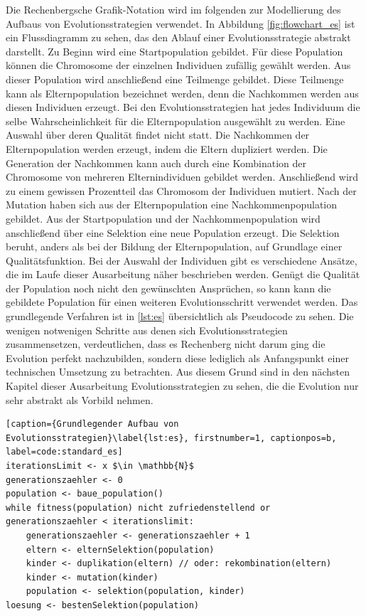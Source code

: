 Die Rechenbergsche Grafik-Notation wird im folgenden zur Modellierung des Aufbaus von Evolutionsstrategien verwendet. In Abbildung \ref{fig:flowchart_es} ist ein Flussdiagramm zu sehen, das den Ablauf einer Evolutionsstrategie abstrakt darstellt.
Zu Beginn wird eine Startpopulation gebildet. Für diese Population können die Chromosome der einzelnen Individuen zufällig gewählt werden. Aus dieser Population wird anschließend eine Teilmenge gebildet. Diese Teilmenge kann als Elternpopulation bezeichnet werden, denn die Nachkommen werden aus diesen Individuen erzeugt. Bei den Evolutionsstrategien hat jedes Individuum die selbe Wahrscheinlichkeit für die Elternpopulation ausgewählt zu werden. Eine Auswahl über deren Qualität findet nicht statt. Die Nachkommen der Elternpopulation werden erzeugt, indem die Eltern dupliziert werden. Die Generation der Nachkommen kann auch durch eine Kombination der Chromosome von mehreren Elternindividuen gebildet werden. Anschließend wird zu einem gewissen Prozentteil das Chromosom der Individuen mutiert. 
Nach der Mutation haben sich aus der Elternpopulation eine Nachkommenpopulation gebildet. Aus der Startpopulation und der Nachkommenpopulation wird anschließend über eine Selektion eine neue Population erzeugt. Die Selektion beruht, anders als bei der Bildung der Elternpopulation, auf Grundlage einer Qualitätsfunktion.
Bei der Auswahl der Individuen gibt es verschiedene Ansätze, die im Laufe dieser Ausarbeitung näher beschrieben werden. Genügt die Qualität der Population noch nicht den gewünschten Ansprüchen, so kann kann die gebildete Population für einen weiteren Evolutionsschritt verwendet werden.
Das grundlegende Verfahren ist in \ref{lst:es} übersichtlich als Pseudocode zu sehen. Die wenigen notwenigen Schritte aus denen sich Evolutionsstrategien zusammensetzen, verdeutlichen, dass es Rechenberg nicht darum ging die Evolution perfekt nachzubilden, sondern diese lediglich als Anfangspunkt einer technischen Umsetzung zu betrachten. Aus diesem Grund sind in den nächsten Kapitel dieser Ausarbeitung Evolutionsstrategien zu sehen, die die Evolution nur sehr abstrakt als Vorbild nehmen.
\begin{lstlisting}[caption={Grundlegender Aufbau von Evolutionsstrategien}\label{lst:es}, firstnumber=1, captionpos=b, label=code:standard_es]
iterationsLimit <- x $\in \mathbb{N}$
generationszaehler <- 0
population <- baue_population()
while fitness(population) nicht zufriedenstellend or generationszaehler < iterationslimit:
	generationszaehler <- generationszaehler + 1
	eltern <- elternSelektion(population)
	kinder <- duplikation(eltern) // oder: rekombination(eltern)
	kinder <- mutation(kinder)
	population <- selektion(population, kinder)
loesung <- bestenSelektion(population)
\end{lstlisting}

